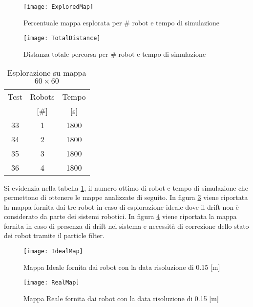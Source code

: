 \begin{figure}[htb]
	\centering
	\texttt{[image: ExploredMap]}
	\caption{Percentuale mappa esplorata per \# robot e tempo di simulazione}
	\label{fig:ExploredMap}
\end{figure}
%
\begin{figure}[htb]
	\centering
	\texttt{[image: TotalDistance]}
	\caption{Distanza totale percorsa per \# robot e tempo di simulazione}
	\label{fig:TotalDistance}
\end{figure}
\begin{table}[htb]
	\centering
	\caption{Esplorazione su mappa $60 \times 60$}
	\label{tab:optimalresults}
	\begin{tabular}{ccc}
	\toprule
	Test 		& 	Robots		&		Tempo\\
				&	[\#]			&		[\si{\second}]\\
	\midrule
      								33    &		1	 	& 1800\\
		 							34	& 		2 		& 1800\\
	\rowcolor[gray]{.9} 	35	& 		3 		& 1800\\
									36 	& 		4 		& 1800\\
     \bottomrule
\end{tabular}
\end{table}
%
\noindent 
Si evidenzia nella tabella \ref{tab:optimalresults}, il numero ottimo di robot 
e tempo di simulazione che permettono di ottenere le mappe analizzate di seguito.
In figura \ref{fig:IdealMap} viene riportata la mappa fornita dai tre robot in
caso di esplorazione ideale dove il drift non è considerato da parte dei sistemi
robotici.
In figura \ref{fig:RealMap} viene riportata la mappa fornita in caso di presenza
di drift nel sistema e necessità di correzione dello stato dei robot tramite il
particle filter.
\begin{figure}[htb]
	\centering
	\texttt{[image: IdealMap]}
	\caption{Mappa Ideale fornita dai robot con la data risoluzione di 0.15 [m]}
\label{fig:IdealMap}
\end{figure}

\begin{figure}[!htb]
	\centering
	\texttt{[image: RealMap]}
	\caption{Mappa Reale fornita dai robot con la data risoluzione di 0.15 [m] }
\label{fig:RealMap}
\end{figure}
